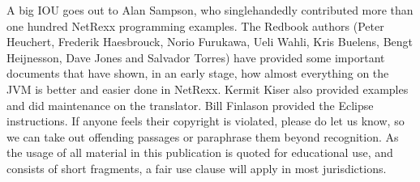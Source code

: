 A big IOU goes out to Alan Sampson, who singlehandedly contributed more than one hundred NetRexx programming examples. The Redbook authors (Peter Heuchert, Frederik Haesbrouck, Norio Furukawa, Ueli Wahli, Kris Buelens, Bengt Heijnesson, Dave Jones and Salvador Torres) have provided some important documents that have shown, in an early stage, how almost everything on the JVM is better and easier done in NetRexx. Kermit Kiser also provided examples and did maintenance on the translator. Bill Finlason provided the Eclipse instructions. If anyone feels their copyright is violated, please do let us know, so we can take out offending passages or paraphrase them beyond recognition. As the usage of all material in this publication is quoted for educational use, and consists of short fragments, a fair use clause will apply in most jurisdictions.

